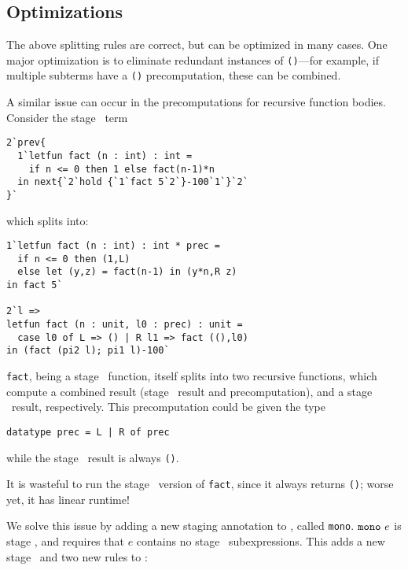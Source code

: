 



\subsection{Optimizations}

The above splitting rules are correct, but can be optimized in many cases. One
major optimization is to eliminate redundant instances of \texttt{()}---for
example, if multiple subterms have a \texttt{()} precomputation, these can be
combined.

A similar issue can occur in the precomputations for recursive function bodies.
Consider the stage \bbtwo\ term
\begin{lstlisting}
2`prev{
  1`letfun fact (n : int) : int = 
    if n <= 0 then 1 else fact(n-1)*n
  in next{`2`hold {`1`fact 5`2`}-100`1`}`2`
}`
\end{lstlisting}
which splits into:
\begin{lstlisting}
1`letfun fact (n : int) : int * prec = 
  if n <= 0 then (1,L) 
  else let (y,z) = fact(n-1) in (y*n,R z)
in fact 5`

2`l => 
letfun fact (n : unit, l0 : prec) : unit = 
  case l0 of L => () | R l1 => fact ((),l0)
in (fact (pi2 l); pi1 l)-100`
\end{lstlisting}
\texttt{fact}, being a stage \bbone\ function, itself splits into two recursive
functions, which compute a combined result (stage \bbone\ result and
precomputation), and a stage \bbtwo\ result, respectively. This precomputation
could be given the type
\begin{lstlisting}
datatype prec = L | R of prec
\end{lstlisting}
while the stage \bbtwo\ result is always \texttt{()}.

It is wasteful to run the stage \bbtwo\ version of \texttt{fact}, since it
always returns \texttt{()}; worse yet, it has linear runtime!

We solve this issue by adding a new staging annotation to \lang, called
\texttt{mono}. ${\tt mono}~e$ is stage \bbone, and requires that $e$ contains
no stage \bbtwo\ subexpressions. This adds a new stage \bbmono\ and two new
rules to \lang:

